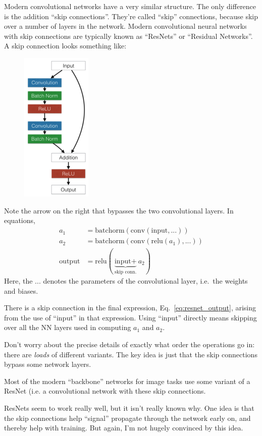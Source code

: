 \documentclass{article}
\begin{document}
Modern convolutional networks have a very similar structure.
The only difference is the addition ``skip connections''.  They're called ``skip'' connections, because skip over a number of layers in the network.
Modern convolutional neural networks with skip connections are typically known as ``ResNets'' or ``Residual Networks''.
A skip connection looks something like:
\begin{figure}[H]
  \centering
  \includegraphics[width=0.3\textwidth]{resnet_block}
\end{figure}
Note the arrow on the right that bypasses the two convolutional layers.
In equations,
\begin{subequations}
\begin{align}
  a_1 &= \text{batchorm}(\text{conv}(\text{input}, ...))\\
  a_2 &= \text{batchorm}(\text{conv}(\text{relu}(a_1), ...))\\
  \label{eq:resnet_output}
  \text{output} &= \text{relu}(\underbrace{\text{input} +}_\text{skip conn.} a_2)
\end{align}
\end{subequations}
Here, the $...$ denotes the parameters of the convolutional layer, i.e.\ the weights and biases.

There is a skip connection in the final expression, Eq.~\eqref{eq:resnet_output}, arising from the use of ``input'' in that expression.
Using ``input'' directly means skipping over all the NN layers used in computing $a_1$ and $a_2$.

Don't worry about the precise details of exactly what order the operations go in: there are \textit{loads} of different variants.
The key idea is just that the skip connections bypass some network layers.

Most of the modern ``backbone'' networks for image tasks use some variant of a ResNet (i.e. a convolutional network with these skip connections.

ResNets seem to work really well, but it isn’t really known why. One idea is that the skip connections help “signal” propagate through the network early on, and thereby help with training.  But again, I'm not hugely convinced by this idea.
\end{document}
